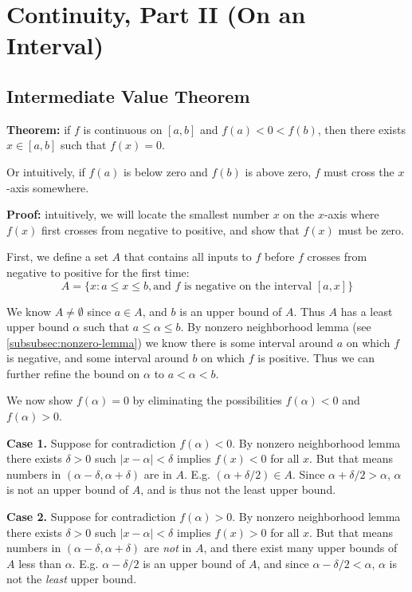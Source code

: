 \section{Continuity, Part II (On an Interval)}

\subsection{Intermediate Value Theorem}\label{ivt}
\textbf{Theorem:} if $f$ is continuous on $[a,b]$ and $f(a)<0<f(b)$,
then there exists $x\in[a,b]$ such that $f(x)=0$.

\vs

Or intuitively, if $f(a)$ is below zero and $f(b)$ is above zero, $f$
must cross the $x$-axis somewhere.

\vs

\textbf{Proof:} intuitively, we will locate the smallest number $x$ on
the $x$-axis where $f(x)$ first crosses from negative to positive, and
show that $f(x)$ must be zero.

\vs

First, we define a set $A$ that contains all inputs to $f$ before $f$
crosses from negative to positive for the first time:
\[A=\{x:a\leq x\leq b, \text{and $f$ is negative on the interval
    $[a,x]$}\}\]

We know $A\neq\emptyset$ since $a\in A$, and $b$ is an upper bound of
$A$. Thus $A$ has a least upper bound $\alpha$ such that
$a\leq\alpha\leq b$. By nonzero neighborhood lemma (see
\ref{subsubsec:nonzero-lemma}) we know there is some interval around
$a$ on which $f$ is negative, and some interval around $b$ on which
$f$ is positive. Thus we can further refine the bound on $\alpha$ to
$a<\alpha<b$.

\vs

We now show $f(\alpha)=0$ by eliminating the possibilities
$f(\alpha)<0$ and $f(\alpha)>0$.

\vs

\textbf{Case 1.} Suppose for contradiction $f(\alpha)<0$. By nonzero
neighborhood lemma there exists $\delta>0$ such $|x-\alpha|<\delta$ implies
$f(x)<0$ for all $x$. But that means numbers in
$(\alpha-\delta, \alpha+\delta)$ are in $A$. E.g.
$(\alpha+\delta/2)\in A$. Since $\alpha+\delta/2>\alpha$, $\alpha$ is not an upper bound of
$A$, and is thus not the least upper bound.

\vs


\textbf{Case 2.} Suppose for contradiction $f(\alpha)>0$. By nonzero
neighborhood lemma there exists $\delta>0$ such $|x-\alpha|<\delta$ implies
$f(x)>0$ for all $x$. But that means numbers in
$(\alpha-\delta, \alpha+\delta)$ are \textit{not} in $A$, and there exist many upper
bounds of $A$ less than $\alpha$. E.g. $\alpha-\delta/2$ is an upper bound of
$A$, and since $\alpha-\delta/2<\alpha$, $\alpha$ is not the \textit{least} upper bound.

